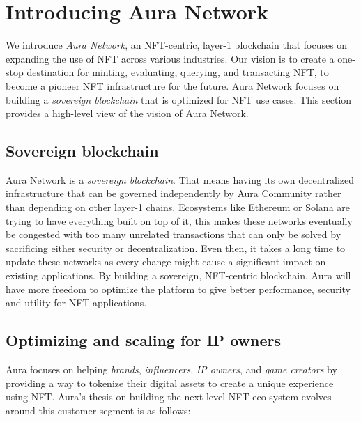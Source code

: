 \documentclass[11pt, titlepage]{article}
\begin{document}
\section{Introducing Aura Network}

We introduce \emph{Aura Network}, an NFT-centric, layer-1 blockchain that focuses on expanding the use of NFT across various industries. Our vision is to create a one-stop destination for minting, evaluating, querying, and transacting NFT, to become a pioneer NFT infrastructure for the future. Aura Network focuses on building a \emph{sovereign blockchain} that is optimized for NFT use cases. This section provides a high-level view of the vision of Aura Network.

\subsection{Sovereign blockchain}
Aura Network is a \emph{sovereign blockchain}. That means having its own decentralized infrastructure that can be governed independently by Aura Community rather than depending on other layer-1 chains. Ecosystems like Ethereum or Solana are trying to have everything built on top of it, this makes these networks eventually be congested with too many unrelated transactions that can only be solved by sacrificing either security or decentralization. Even then, it takes a long time to update these networks as every change might cause a significant impact on existing applications. By building a sovereign, NFT-centric blockchain, Aura will have more freedom to optimize the platform to give better performance, security and utility for NFT applications. 

\subsection{Optimizing and scaling for IP owners}
Aura focuses on helping \emph{brands}, \emph{influencers}, \emph{IP owners}, and \emph{game creators} by providing a way to tokenize their digital assets to create a unique experience using NFT. Aura's thesis on building the next level NFT eco-system evolves around this customer segment is as follows:
\end{document}
